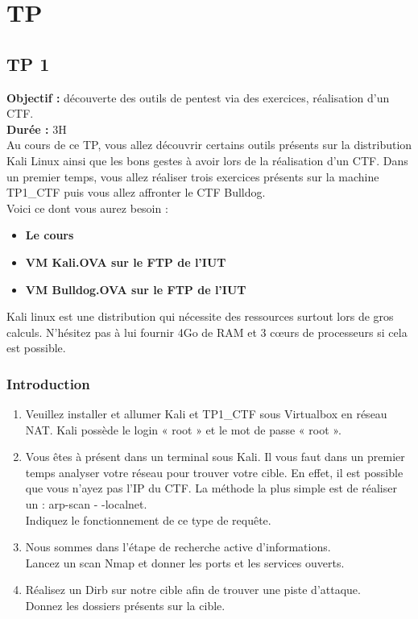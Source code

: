 \chapter{TP}

\section{TP 1}

\textbf{Objectif :} découverte des outils de pentest via des exercices, réalisation d’un CTF.\\
\textbf{Durée :} 3H\\

Au cours de ce TP, vous allez découvrir certains outils présents sur la distribution Kali Linux ainsi que les bons gestes à avoir lors de la réalisation d’un CTF. Dans un premier temps, vous allez réaliser trois exercices présents sur la machine TP1\_CTF puis vous allez affronter le CTF Bulldog. \\
 Voici ce dont vous aurez besoin :

\begin{itemize}
    \item \textbf{Le cours}
    \item \textbf{VM Kali.OVA sur le FTP  de l’IUT}
    \item \textbf{VM Bulldog.OVA sur le FTP de l’IUT}
\end{itemize}

 Kali linux est une distribution qui nécessite des ressources surtout lors de gros calculs. N’hésitez pas à lui fournir 4Go de RAM et 3 cœurs de processeurs si cela est possible.

\subsection{Introduction}


\begin{enumerate}
    \item Veuillez installer et allumer Kali et TP1\_CTF sous Virtualbox en réseau NAT. Kali possède le login « root » et le mot de passe « root ».
    \item Vous êtes à présent dans un terminal sous Kali. Il vous faut dans un premier temps analyser votre réseau pour trouver votre cible. En effet, il est possible que vous n’ayez pas l’IP du CTF. La méthode la plus simple est de réaliser un : arp-scan  - -localnet.\\
    Indiquez le fonctionnement de ce type de requête.
    \item Nous sommes dans l’étape de recherche active d’informations.\\
    Lancez un scan Nmap et donner les ports et les services ouverts.
    \item Réalisez un Dirb sur notre cible afin de trouver une piste d’attaque.\\ 
    Donnez les dossiers présents sur la cible.
\end{enumerate}

